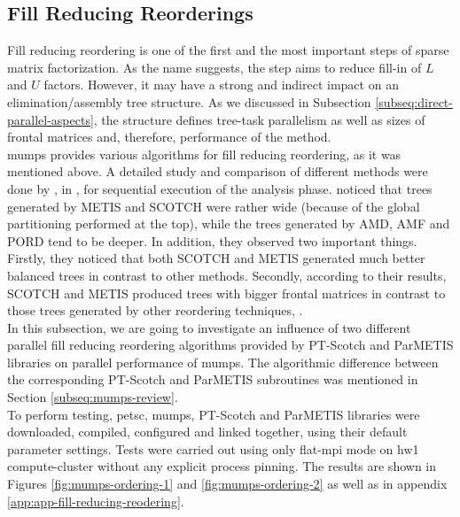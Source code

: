 \subsection{Fill Reducing Reorderings}
\label{subseq:fill-in-reordering}

Fill reducing reordering is one of the first and the most important steps of sparse matrix factorization. As the name suggests, the step aims to reduce fill-in of $L$ and $U$ factors. However, it may have a strong and indirect impact on an elimination/assembly tree structure. As we discussed in Subsection \ref{subseq:direct-parallel-aspects}, the structure defines tree-task parallelism as well as sizes of frontal matrices and, therefore, performance of the method.\\


\acrshort{mumps} provides various algorithms for fill reducing reordering, as it was mentioned above. A detailed study and comparison of different methods were done by \citeauthor{guermouche2003memory}, in  \cite{guermouche2003memory}, for sequential execution of the analysis phase. \citeauthor{guermouche2003memory} noticed that  trees generated by METIS and SCOTCH were rather wide (because of the global partitioning performed at the top), while the trees generated by AMD, AMF and PORD tend to be deeper. In addition, they observed two important things. Firstly, they noticed that both SCOTCH and METIS generated much better balanced trees in contrast to other methods. Secondly, according to their results, SCOTCH and METIS produced trees with bigger frontal matrices in contrast to those trees generated by other reordering techniques, \cite{guermouche2003memory}.\\


In this subsection, we are going to investigate an influence of two different parallel fill reducing reordering algorithms provided by PT-Scotch and ParMETIS libraries on parallel performance of \acrshort{mumps}. The algorithmic difference between the corresponding PT-Scotch and ParMETIS subroutines was mentioned in Section \ref{subseq:mumps-review}.\\


To perform testing, \acrshort{petsc}, \acrshort{mumps}, PT-Scotch and ParMETIS libraries were downloaded, compiled, configured and linked together, using their default parameter settings. Tests were carried out using only flat-\acrshort{mpi} mode on \gls{hw1} compute-cluster without any explicit process pinning. The results are shown in Figures \ref{fig:mumps-ordering-1} and \ref{fig:mumps-ordering-2} as well as in appendix \ref{app:app-fill-reducing-reodering}.\\



